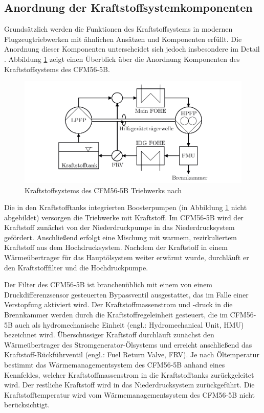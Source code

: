\subsection{Anordnung der Kraftstoffsystemkomponenten}

Grundsätzlich werden die Funktionen des Kraftstoffsystems in modernen Flugzeugtriebwerken mit ähnlichen Ansätzen und Komponenten erfüllt. Die Anordnung dieser Komponenten unterscheidet sich jedoch insbesondere im Detail \cite{LinkeDiesinger.2014}. Abbildung \ref{fig:2.1} zeigt einen Überblick über die Anordnung Komponenten des Kraftstoffsystems des CFM56-5B. 

\begin{figure}[ht]
\centering
\includegraphics[width=1\linewidth]{4_Abbildungen/2_Hauptteil/Kraftstoffsystem Abbildungen/CFM56 Kraftstoffsystem 2.pdf}
  \caption{Kraftstoffsystems des CFM56-5B Triebwerks nach \cite{LinkeDiesinger.2014}}
  \label{fig:2.1}
\end{figure}
\FloatBarrier

Die in den Kraftstofftanks integrierten Boosterpumpen (in Abbildung \ref{fig:2.1} nicht abgebildet) versorgen die Triebwerke mit Kraftstoff. Im CFM56-5B wird der Kraftstoff zunächst von der Niederdruckpumpe in das Niederdrucksystem gefördert. Anschließend erfolgt eine Mischung mit warmem, rezirkuliertem Kraftstoff aus dem Hochdrucksystem. Nachdem der Kraftstoff in einem Wärmeübertrager für das Hauptölsystem weiter erwärmt wurde, durchläuft er den Kraftstofffilter und die Hochdruckpumpe.

Der Filter des CFM56-5B ist branchenüblich mit einem von einem Druckdifferenzsensor gesteuerten Bypassventil ausgestattet, das im Falle einer Verstopfung aktiviert wird. Der Kraftstoffmassenstrom und -druck in die Brennkammer werden durch die Kraftstoffregeleinheit gesteuert, die im CFM56-5B auch als hydromechanische Einheit (engl.: Hydromechanical Unit, HMU) bezeichnet wird. Überschüssiger Kraftstoff durchläuft zunächst den Wärmeübertrager des Stromgenerator-Ölsystems und erreicht anschließend das Kraftstoff-Rückführventil (engl.: Fuel Return Valve, FRV). Je nach Öltemperatur bestimmt das Wärmemanagementsystem des CFM56-5B anhand eines Kennfeldes, welcher Kraftstoffmassenstrom in die Kraftstofftanks zurückgeleitet wird. Der restliche Kraftstoff wird in das Niederdrucksystem zurückgeführt. Die Kraftstofftemperatur wird vom Wärmemanagementsystem des CFM56-5B nicht berücksichtigt. \cite{Braunling.2015, LinkeDiesinger.2014}

